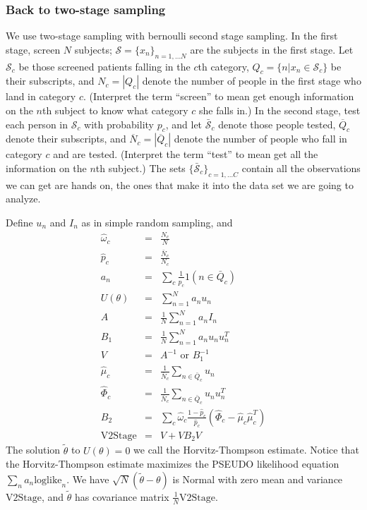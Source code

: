 \documentclass[11pt]{article}
\begin{document}
\subsubsection{Back to two-stage sampling}
\label{sec:roadmap}

We use two-stage sampling with bernoulli second stage sampling.  In
the first stage, screen $N$ subjects; $\mathcal{S} =
\{x_n\}_{n=1,...N}$ are the subjects in the 
first stage. 
Let $\mathcal{S}_c$ be those screened patients falling in the $c$th category, 
$Q_c = \{n|x_n \in \mathcal{S}_c\}$ be their subscripts, and $N_c = |Q_c|$ 
denote the number of people in the first stage who land in category
$c$.  (Interpret the term ``screen'' to mean get enough information
on the $n$th subject to know what category $c$ she falls in.) In the
second stage, test each person in $\mathcal{S}_c$ with probability
$p_c$, and let $\bar{\mathcal{S}}_c$ denote those people tested,
$\overline{Q}_c$ denote their subscripts, and $\overline{N}_c =
|\overline{Q}_c|$ 
denote the number of people who fall in category $c$ and are
tested. (Interpret the term ``test'' to mean get all the information
on the $n$th subject.) The sets
$\{\bar{\mathcal{S}}_c\}_{c=1,...C}$  contain all the observations we can
get are hands on, the ones that make it into the data set we are going
to analyze.

Define $u_n$ and $I_n$ as in simple random sampling, and 
\begin{eqnarray}
\hat{\omega}_c & = & \frac{N_c}{N} \\
\hat{p}_c & = & \frac{\bar{N}_c}{N_c}\\
a_n & = & \sum_c \frac{1}{\hat{p}_c}1(n \in \bar{Q}_c)\\
U(\theta) & = & \sum_{n=1} ^N a_n u_n \\
A & = & \frac{1}{N}\sum_{n=1} ^N a_n I_n\\
B_1 & = & \frac{1}{N}\sum_{n=1} ^N a_n u_n u_n^T \\
V & = & A^{-1} \mbox{  or  } B_1^{-1}\\
\hat{\mu}_c & = & \frac{1}{\bar{N}_c} \sum_{n \in \bar{Q}_c}u_n\\
\hat{\Phi}_c & = & \frac{1}{\bar{N}_c} \sum_{n \in \bar{Q}_c}u_nu_n^T\\
B_2 & = & \sum_c \hat{\omega}_c
                 \frac{1-\hat{p}_c}{\hat{p}_c}(\hat{\Phi}_c -
                   \hat{\mu}_c\hat{\mu}_c^T)\\
\mbox{V2Stage} & = & V + V B_2 V \label{eq:endmap}
\end{eqnarray}
The solution $\tilde{\theta}$ to $U(\theta) = 0$ we call 
the  Horvitz-Thompson estimate.  Notice that the 
Horvitz-Thompson estimate maximizes the PSEUDO likelihood equation 
$\sum_n a_n \mbox{loglike}_n$.  We have  $\sqrt{N}(\tilde{\theta}-\theta)$ is Normal
with zero mean and variance $\mbox{V2Stage}$, and $\tilde{\theta}$ has covariance
matrix $\frac{1}{N} \mbox{V2Stage}$.  
\end{document}
